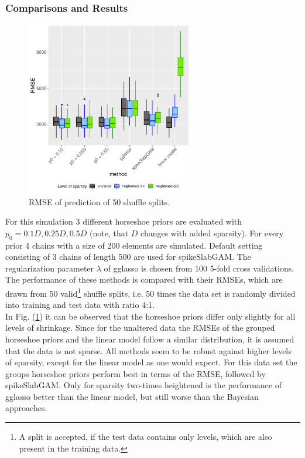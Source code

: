 \documentclass[12pt,letterpaper]{article}
\numberwithin{equation}{subsection}
\begin{document}
\subsubsection{Comparisons and Results}
\label{sec:amcs}
\begin{figure}[hbt!]
 \centering
 \includegraphics[width=0.65\textwidth]{../plots/am-mse.pdf}
 \caption[RMSE of prediction (automobile)]{RMSE of prediction of 50 shuffle splits.}
 \label{fig:am-mse}
\end{figure}
For this simulation 3 different horseshoe priors are evaluated with $p_0 = 0.1D, 0.25D, 0.5D$ (note, that $D$ changes with added sparsity).  For every prior 4 chains with a size of 200 elements are simulated. Default setting consisting of 3 chains of length 500 are used for spikeSlabGAM. The regularization parameter $\lambda$ of gglasso is chosen from 100 5-fold cross validations.
The performance of these methods is compared with their RMSEs, which are drawn from 50 valid\footnote{A split is accepted, if the test data contains only  levels, which are also present in the training data.}  shuffle splits, i.e. 50 times the data set is randomly divided into training and test data with ratio 4:1. \\
In Fig. (\ref{fig:am-mse}) it can be observed that the horseshoe priors differ only slightly for all levels of shrinkage.
Since for the unaltered data the RMSEs of the grouped horseshoe priors and the linear model follow a similar distribution, it is assumed that the data is not sparse. All methods seem to be robust against higher levels of sparsity, except for the linear model as one would expect. For this data set the groups horseshoe priors perform best in terms of the RMSE, followed by spikeSlabGAM. Only for sparsity two-times heightened is the performance of gglasso better than the linear model, but still worse than the Bayesian approaches.
\FloatBarrier
\end{document}
